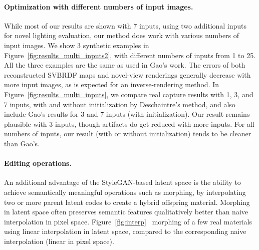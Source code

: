\paragraph{Optimization with different numbers of input images.} While most of our results are shown with 7 inputs, using two additional inputs for novel lighting evaluation, our method does work with various numbers of input images. We show 3 synthetic examples in Figure~\ref{fig:results_multi_inputs2}, with different numbers of inputs from 1 to 25. All the three examples are the same as used in Gao's work. The errors of both reconstructed SVBRDF maps and novel-view renderings generally decrease with more input images, as is expected for an inverse-rendering method. In Figure~\ref{fig:results_multi_inputs}, we compare real capture results with 1, 3, and 7 inputs, with and without initialization by Deschaintre's method, and also include Gao's results for 3 and 7 inputs (with initialization). Our result remains plausible with 3 inputs, though artifacts do get reduced with more inputs. For all numbers of inputs, our result (with or without initialization) tends to be cleaner than Gao's.
%
\paragraph{Editing operations.} An additional advantage of the StyleGAN-based latent space is the ability to achieve semantically meaningful operations such as morphing, by interpolating two or more parent latent codes to create a hybrid offspring material. Morphing in latent space often preserves semantic features qualitatively better than naive interpolation in pixel space. Figure~\ref{fig:interp}~ morphing of a few real materials using linear interpolation in latent space, compared to the corresponding naive interpolation (linear in pixel space).
%

%
